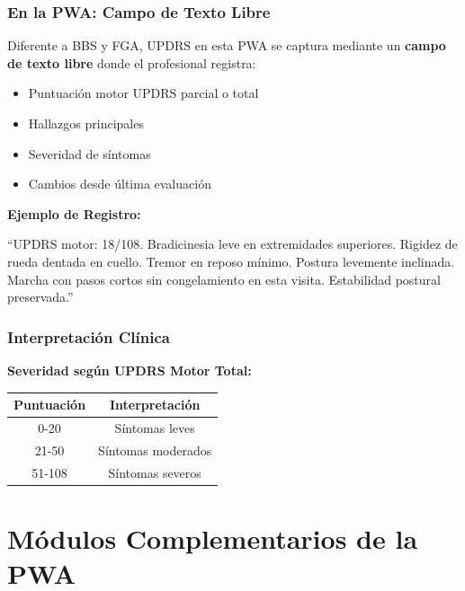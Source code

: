 \documentclass[12pt,a4paper,spanish,oneside]{book}
\begin{document}
\subsection{En la PWA: Campo de Texto Libre}

Diferente a BBS y FGA, UPDRS en esta PWA se captura mediante un \textbf{campo de texto libre} donde el profesional registra:

\begin{itemize}
  \item Puntuación motor UPDRS parcial o total
  \item Hallazgos principales
  \item Severidad de síntomas
  \item Cambios desde última evaluación
\end{itemize}

\textbf{Ejemplo de Registro:}

\begin{ejemplobox}
  ``UPDRS motor: 18/108. Bradicinesia leve en extremidades superiores. Rigidez de rueda dentada en cuello. Tremor en reposo mínimo. Postura levemente inclinada. Marcha con pasos cortos sin congelamiento en esta visita. Estabilidad postural preservada.''
\end{ejemplobox}

\subsection{Interpretación Clínica}

\textbf{Severidad según UPDRS Motor Total:}

\begin{table}[h]
  \centering
  \begin{tabular}{|c|c|}
    \hline
    \textbf{Puntuación} & \textbf{Interpretación} \\
    \hline
    0-20 & Síntomas leves \\
    \hline
    21-50 & Síntomas moderados \\
    \hline
    51-108 & Síntomas severos \\
    \hline
  \end{tabular}
\end{table}

\chapter{Módulos Complementarios de la PWA}
\end{document}
